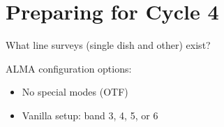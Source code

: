 \section{Preparing for Cycle 4}

What line surveys (single dish and other) exist?




ALMA configuration options:

\begin{itemize}
    \item No special modes (OTF)
    \item Vanilla setup: band 3, 4, 5, or 6
\end{itemize}